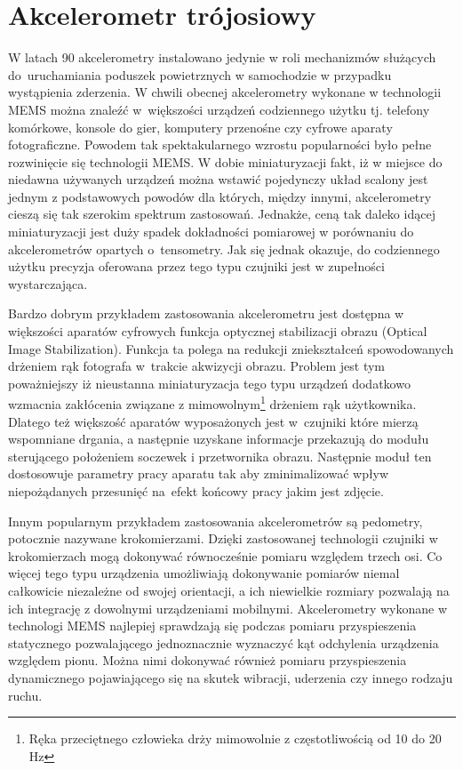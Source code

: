 \section{Akcelerometr trójosiowy}
\label{sec:accelometer}
W latach 90 akcelerometry instalowano jedynie w roli mechanizmów służących do~uruchamiania poduszek powietrznych w samochodzie w przypadku wystąpienia
zderzenia. W chwili obecnej akcelerometry wykonane w technologii
MEMS można znaleźć w~większości urządzeń codziennego użytku tj.
telefony komórkowe, konsole do gier, komputery przenośne czy cyfrowe aparaty
fotograficzne. Powodem tak spektakularnego wzrostu popularności było pełne
rozwinięcie się technologii MEMS. W dobie miniaturyzacji fakt, iż w miejsce do
niedawna używanych urządzeń można wstawić pojedynczy układ
scalony jest jednym z podstawowych powodów dla których, między innymi,
akcelerometry cieszą się tak szerokim spektrum zastosowań. Jednakże, ceną tak
daleko idącej miniaturyzacji jest duży spadek dokładności pomiarowej w
porównaniu do akcelerometrów opartych o~tensometry. Jak się jednak okazuje, do
codziennego użytku precyzja oferowana przez tego typu czujniki jest w zupełności wystarczająca.

Bardzo dobrym przykładem zastosowania akcelerometru jest dostępna w większości
aparatów cyfrowych funkcja optycznej stabilizacji obrazu (Optical Image
Stabilization). Funkcja ta polega na redukcji zniekształceń  spowodowanych
drżeniem rąk fotografa w~trakcie akwizycji obrazu. Problem jest tym poważniejszy
iż nieustanna miniaturyzacja tego typu urządzeń dodatkowo wzmacnia zakłócenia
związane z mimowolnym\footnote{Ręka przeciętnego człowieka drży mimowolnie z
częstotliwością od 10 do 20 Hz} drżeniem rąk użytkownika. Dlatego też większość
aparatów wyposażonych jest w~czujniki które mierzą wspomniane drgania, a następnie uzyskane informacje przekazują do modułu
sterującego położeniem soczewek i przetwornika obrazu. Następnie moduł ten
dostosowuje parametry pracy aparatu tak aby zminimalizować wpływ niepożądanych
przesunięć na~efekt końcowy pracy jakim jest zdjęcie.

Innym popularnym przykładem zastosowania akcelerometrów są pedometry, potocznie 
nazywane krokomierzami. Dzięki zastosowanej technologii czujniki w krokomierzach
mogą dokonywać równocześnie pomiaru względem trzech osi. Co więcej tego typu
urządzenia umożliwiają dokonywanie pomiarów niemal całkowicie niezależne od
swojej orientacji, a ich niewielkie rozmiary pozwalają na ich integrację z 
dowolnymi urządzeniami mobilnymi. Akcelerometry wykonane w technologi MEMS
najlepiej sprawdzają się  podczas pomiaru przyspieszenia statycznego
pozwalającego jednoznacznie wyznaczyć kąt odchylenia urządzenia względem pionu. 
Można nimi dokonywać również pomiaru przyspieszenia dynamicznego pojawiającego 
się na skutek wibracji, uderzenia czy innego rodzaju ruchu. 

